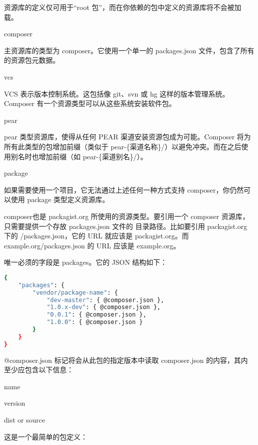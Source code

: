 资源库的定义仅可用于“root 包”，而在你依赖的包中定义的资源库将不会被加载。

\begin{compactitem}
\item composer

主资源库的类型为 composer。它使用一个单一的 packages.json 文件，包含了所有的资源包元数据。

\item vcs

VCS 表示版本控制系统。这包括像 git、svn 或 hg 这样的版本管理系统。Composer 有一个资源类型可以从这些系统安装软件包。

\item pear

pear 类型资源库，使得从任何 PEAR 渠道安装资源包成为可能。Composer 将为所有此类型的包增加前缀（类似于 pear-\{渠道名称\}/）以避免冲突。而在之后使用别名时也增加前缀（如 pear-\{渠道别名\}/）。

\item package

如果需要使用一个项目，它无法通过上述任何一种方式支持 composer，你仍然可以使用 package 类型定义资源库。

\end{compactitem}

composer也是 packagist.org 所使用的资源类型。要引用一个 composer 资源库，只需要提供一个存放 packages.json 文件的 目录路径。比如要引用 packagist.org 下的 /packages.json，它的 URL 就应该是 packagist.org。而 example.org/packages.json 的 URL 应该是 example.org。

唯一必须的字段是 packages。它的 JSON 结构如下：


\begin{lstlisting}[language=bash]
{
    "packages": {
        "vendor/package-name": {
            "dev-master": { @composer.json },
            "1.0.x-dev": { @composer.json },
            "0.0.1": { @composer.json },
            "1.0.0": { @composer.json }
        }
    }
}
\end{lstlisting}

@composer.json 标记将会从此包的指定版本中读取 composer.json 的内容，其内至少应包含以下信息：

\begin{compactitem}
\item name
\item version
\item dist or source
\end{compactitem}

这是一个最简单的包定义：

